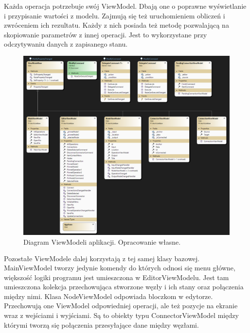 Każda operacja potrzebuje swój ViewModel. Dbają one o poprawne wyświetlanie i przypisanie wartości z modelu. Zajmują się też uruchomieniem obliczeń i zwróceniem ich rezultatu. Każdy z nich posiada też metodę pozwalającą na skopiowanie parametrów z innej operacji. Jest to wykorzystane przy odczytywaniu danych z zapisanego stanu.

\begin{figure}[H]
    \centering
    \includegraphics[width=1\linewidth]{images/Picture21.png}
    \caption{Diagram ViewModeli aplikacji. Opracowanie własne.}
    \label{fig:vmDiagEditor}
\end{figure}

Pozostałe ViewModele dalej korzystają z tej samej klasy bazowej.
MainViewModel tworzy jedynie komendy do których odnosi się menu główne, większość logiki programu jest umieszczona w EditorViewModelu.
Jest tam umieszczona kolekcja przechowująca stworzone węzły i ich stany oraz połączenia między nimi.
Klasa NodeViewModel odpowiada bloczkom w edytorze. Przechowują one ViewModel odpowiedniej operacji, ale też pozycje na ekranie wraz z wejściami i wyjściami. 
Są to obiekty typu ConnectorViewModel między którymi tworzą się połączenia przesyłające dane między węzłami. 
